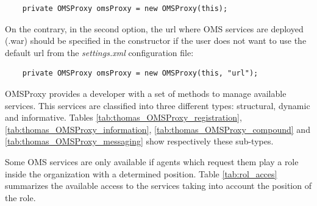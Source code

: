 \begin{lstlisting}
	private OMSProxy omsProxy = new OMSProxy(this);
\end{lstlisting}

On the contrary, in the second option, the url where OMS services are deployed (.war) should be specified in the constructor if the user does not want to use the default url from the \textit{settings.xml} configuration file:

\begin{lstlisting}
	private OMSProxy omsProxy = new OMSProxy(this, "url");
\end{lstlisting}


OMSProxy provides a developer with a set of methods to manage available services. This services are classified into three different types: structural, dynamic and informative. Tables \ref{tab:thomas_OMSProxy_registration}, \ref{tab:thomas_OMSProxy_information}, \ref{tab:thomas_OMSProxy_compound} and \ref{tab:thomas_OMSProxy_messaging} show respectively these sub-types. 

Some OMS services are only available if  agents which request them play a role inside the organization with a determined position. Table \ref{tab:rol_acces} summarizes  the available access to the services taking into account the position of the role.







